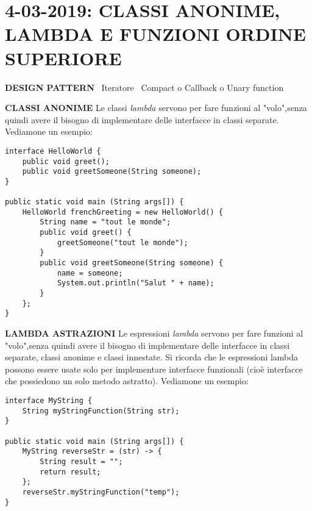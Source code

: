 

\newpage
\section{4-03-2019: CLASSI ANONIME, LAMBDA E FUNZIONI ORDINE SUPERIORE}
\textbf{DESIGN PATTERN} \newline
\textbullet\ Iteratore \newline
\textbullet\ Compact o Callback o Unary function 

\noindent \textbf{CLASSI ANONIME} \newline
Le classi \textit{lambda} servono per fare funzioni al "volo",senza quindi avere il bisogno di implementare delle interfacce in classi separate. Vediamone un esempio:

\begin{lstlisting}
interface HelloWorld {
	public void greet();
    public void greetSomeone(String someone);
}

public static void main (String args[]) {
    HelloWorld frenchGreeting = new HelloWorld() {
        String name = "tout le monde";
        public void greet() {
            greetSomeone("tout le monde");
        }
        public void greetSomeone(String someone) {
            name = someone;
            System.out.println("Salut " + name);
        }
    };
}

\end{lstlisting}

\noindent \textbf{LAMBDA ASTRAZIONI} \newline
Le espressioni \textit{lambda} servono per fare funzioni al "volo",senza quindi avere il bisogno di implementare delle interfacce in classi separate, classi anonime e classi innestate. Si ricorda che le espressioni lambda possono essere usate solo per implementare interfacce funzionali (cioè interfacce che possiedono un solo metodo astratto). Vediamone un esempio:

\begin{lstlisting}
interface MyString {
	String myStringFunction(String str);
}

public static void main (String args[]) {
	MyString reverseStr = (str) -> {
		String result = "";		
		return result;
	};
	reverseStr.myStringFunction("temp");
}
\end{lstlisting}

